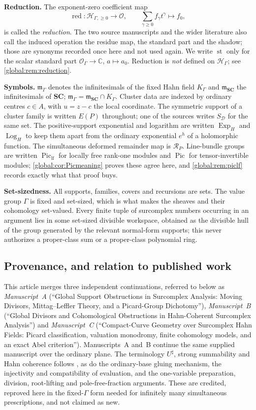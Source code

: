 \documentclass[11pt,letterpaper]{article}
\theoremstyle{definition}
\theoremstyle{remark}
\newcommand{\SC}{\mathbf{SC}}
\newcommand{\C}{\mathbb C}
\newcommand{\OO}{\mathcal O}
\newcommand{\HH}{\mathscr H_\Gamma}
\newcommand{\HI}{\mathscr H_{\Gamma,\ge0}}
\newcommand{\KK}{K_\Gamma}
\newcommand{\mK}{\mathfrak m_\Gamma}
\newcommand{\mSC}{\mathfrak m_{\SC}}
\newcommand{\sh}{^{\sharp}}
\newcommand{\st}{\operatorname{st}}
\newcommand{\red}{\operatorname{red}}
\newcommand{\Pic}{\operatorname{Pic}}
\newcommand{\Piclf}{\operatorname{Pic}_{\mathrm{lf}}}
\newcommand{\ExpH}{\operatorname{Exp}_{H}}
\newcommand{\LogH}{\operatorname{Log}_{H}}
\newcommand{\jet}{\mathcal R}
\numberwithin{equation}{section}
\begin{document}
\smallskip
\noindent\textbf{Reduction.} The exponent-zero coefficient map
\[
  \red:\HI\longrightarrow\OO,
  \qquad \sum_{\gamma\ge0}f_\gamma t^\gamma\longmapsto f_0,
\]
is called the \emph{reduction}. The two source manuscripts and the wider literature also call the induced operation the residue map, the standard part and the shadow; those are synonyms recorded once here and not used again. We write $\st$ only for the scalar standard part $\OO_\Gamma\to\C$, $a\mapsto a_0$. Reduction is \emph{not} defined on $\HH$; see \cref{global:rem:reduction}.

\smallskip
\noindent\textbf{Symbols.} $\mK$ denotes the infinitesimals of the fixed Hahn field $\KK$ and $\mSC$ the infinitesimals of $\SC$; $\mK=\mSC\cap\KK$. Cluster data are indexed by ordinary centres $c\in A$, with $u=z-c$ the local coordinate. The symmetric support of a cluster family is written $E(P)$ throughout; one of the sources writes $S_{\mathcal D}$ for the same set. The positive-support exponential and logarithm are written $\ExpH$ and $\LogH$ to keep them apart from the ordinary exponential $e^h$ of a holomorphic function. The simultaneous deformed remainder map is $\jet_P$. Line-bundle groups are written $\Piclf$ for locally free rank-one modules and $\Pic$ for tensor-invertible modules; \cref{global:cor:Picmeaning} proves these agree here, and \cref{global:rem:piclf} records exactly what that proof buys.

\smallskip
\noindent\textbf{Set-sizedness.} All supports, families, covers and recursions are sets. The value group $\Gamma$ is fixed and set-sized, which is what makes the sheaves and their cohomology set-valued. Every finite tuple of surcomplex numbers occurring in an argument lies in some set-sized divisible workspace, obtained as the divisible hull of the group generated by the relevant normal-form supports; this never authorizes a proper-class sum or a proper-class polynomial ring.

\subsection{Provenance, and relation to published work}\label{global:sub:provenance}

This article merges three independent continuations, referred to below as \emph{Manuscript~A} (``Global Support Obstructions in Surcomplex Analysis: Moving Divisors, Mittag--Leffler Theory, and a Picard-Group Dichotomy''), \emph{Manuscript~B} (``Global Divisors and Cohomological Obstructions in Hahn-Coherent Surcomplex Analysis'') and \emph{Manuscript~C} (``Compact-Curve Geometry over Surcomplex Hahn Fields: Picard classification, valuation monodromy, finite cohomology models, and an exact Abel criterion''). Manuscripts~A and~B continue the same supplied manuscript \cite{Source} over the ordinary plane. The terminology $U\sh$, strong summability and Hahn coherence follows \cite{Source}, as do the ordinary-base gluing mechanism, the injectivity and compatibility of evaluation, and the one-variable preparation, division, root-lifting and pole-free-fraction arguments. These are credited, reproved here in the fixed-$\Gamma$ form needed for infinitely many simultaneous prescriptions, and not claimed as new.
\end{document}
